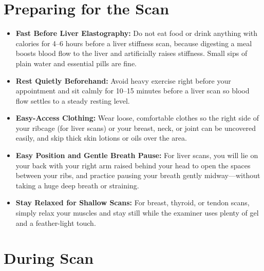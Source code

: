 \section{Preparing for the Scan}

\begin{itemize}
    \item \textbf{Fast Before Liver Elastography:} Do not eat food or drink anything with calories for 4--6 hours before a liver stiffness scan, because digesting a meal boosts blood flow to the liver and artificially raises stiffness. Small sips of plain water and essential pills are fine.
    \item \textbf{Rest Quietly Beforehand:} Avoid heavy exercise right before your appointment and sit calmly for 10--15 minutes before a liver scan so blood flow settles to a steady resting level.
    \item \textbf{Easy-Access Clothing:} Wear loose, comfortable clothes so the right side of your ribcage (for liver scans) or your breast, neck, or joint can be uncovered easily, and skip thick skin lotions or oils over the area.
    \item \textbf{Easy Position and Gentle Breath Pause:} For liver scans, you will lie on your back with your right arm raised behind your head to open the spaces between your ribs, and practice pausing your breath gently midway---without taking a huge deep breath or straining.
    \item \textbf{Stay Relaxed for Shallow Scans:} For breast, thyroid, or tendon scans, simply relax your muscles and stay still while the examiner uses plenty of gel and a feather-light touch.
\end{itemize}

\section{During Scan}

